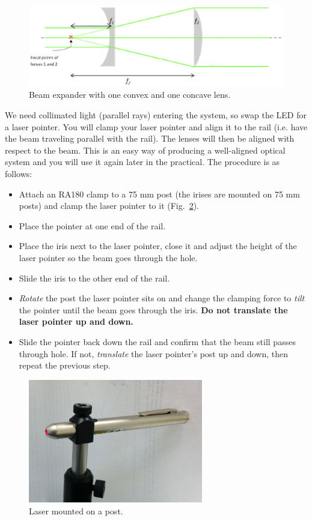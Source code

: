 \documentclass[a4paper]{report}
\begin{document}
\begin{figure}[h]
\center
\includegraphics[width=4.5in]{beamExpander2.eps}
\caption{Beam expander with one convex and one concave lens.}
\label{beamExpander2}
\end{figure}

We need collimated light (parallel rays) entering the system, so swap the LED for a laser pointer.
You will clamp your laser pointer and align it to the rail (i.e. have the beam traveling parallel with the rail). 
The lenses will then be aligned with respect to the beam. 
This is an easy way of producing a well-aligned optical system and you will use it again later in the practical.
The procedure is as follows:

\begin{itemize}
\item Attach an RA180 clamp to a 75 mm post (the irises are mounted on 75 mm posts) and clamp the laser pointer to it (Fig.~\ref{fig:mounted_laser}).
\item Place the pointer at one end of the rail.
\item Place the iris next to the laser pointer, close it and adjust the height of the laser pointer so the beam goes through the hole. 
\item Slide the iris to the other end of the rail. 
\item \textit{Rotate} the post the laser pointer sits on and change the clamping force to \textit{tilt} the pointer until the beam goes through the iris. 
\textbf{Do not translate the laser pointer up and down.}
\item Slide the pointer back down the rail and confirm that the beam still passes through hole. 
If not, \textit{translate} the laser pointer's post up and down, then repeat the previous step.
\end{itemize}

\begin{figure}[h]
\center
\includegraphics[width=3in]{mounted_laser.eps}
\caption{Laser mounted on a post.}
\label{fig:mounted_laser}
\end{figure}
\end{document}
